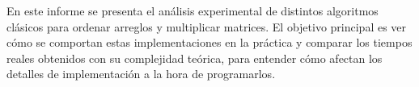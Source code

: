 En este informe se presenta el análisis experimental de distintos algoritmos clásicos para ordenar arreglos y multiplicar matrices. El objetivo principal es ver cómo se comportan estas implementaciones en la práctica y comparar los tiempos reales obtenidos con su complejidad teórica, para entender cómo afectan los detalles de implementación a la hora de programarlos.